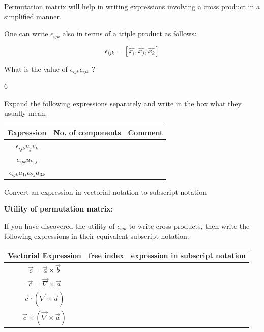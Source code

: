 Permutation matrix will help in writing expressions involving a cross product in a simplified manner.

One can write $\epsilon_{ijk}$ also in terms of a triple product as follows:

$$ \epsilon_{ijk} = \left[ \hat{x_i}, \hat{x_j}, \hat{x_k} \right] $$


\begin{question}
What is the value of $\epsilon_{ijk} \epsilon_{ijk}$ ?
\end{question}
\begin{solution}[print]
6
\end{solution}



Expand the following expressions separately and write in the box what they usually mean.


\begin{tabular}{| c | m{4cm} | m{5 cm} |}
\hline
Expression & No. of components & Comment \\
\hline
$\epsilon_{ijk} u_j v_k$ & &\\[1cm]
\hline
$\epsilon_{ijk} u_{k,j}$ &  & \\[1cm]
\hline
$\epsilon_{ijk} a_{1i} a_{2j} a_{3k}$ &  & \\[1cm]
\hline
\end{tabular}

\begin{lo3}[Preliminaries]
Convert an expression in vectorial notation to subscript notation
\end{lo3}


{\bf Utility of permutation matrix}:

If you have discovered the utility of $\epsilon_{ijk}$ to write cross products, then write the following expressions in their equivalent subscript notation.

\begin{tabular}{| c | m{2cm} | m{7 cm} |}
\hline
Vectorial Expression & free index & expression in subscript notation \\
\hline
$\vec{c} = \vec{a} \times \vec{b}$ & &\\[1cm]
\hline
$\vec{c} = \vec{\nabla} \times \vec{a}$ & &\\[1cm]
\hline
$\vec{c} \cdot \left( \vec{\nabla} \times \vec{a} \right)$ & &\\[1cm]
\hline
$\vec{c} \times \left( \vec{\nabla} \times \vec{a} \right)$ & &\\[1cm]
\hline
\end{tabular}


